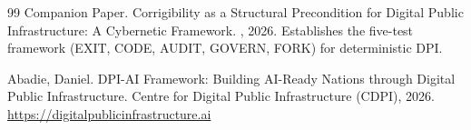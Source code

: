 \documentclass[11pt,a4paper]{article}
\theoremstyle{definition}
\begin{document}
\begin{thebibliography}{99}
Companion Paper.
\newblock Corrigibility as a Structural Precondition for Digital Public Infrastructure: A Cybernetic Framework.
, 2026.
\newblock Establishes the five-test framework (EXIT, CODE, AUDIT, GOVERN, FORK) for deterministic DPI.

Abadie, Daniel.
\newblock DPI-AI Framework: Building AI-Ready Nations through Digital Public Infrastructure.
\newblock Centre for Digital Public Infrastructure (CDPI), 2026.
\newblock \url{https://digitalpublicinfrastructure.ai}

\end{thebibliography}
\end{document}

